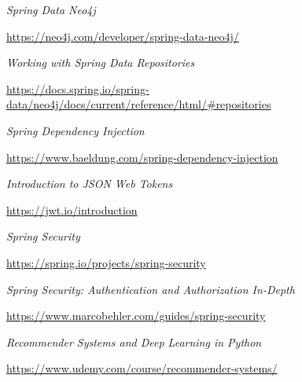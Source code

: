 \documentclass[12pt,a4paper]{report}
\begin{document}
\begin{thebibliography}{9}
  \textit{Spring Data Neo4j}
  
  \url{https://neo4j.com/developer/spring-data-neo4j/}
  
  
  \textit{Working with Spring Data Repositories}
  
  \url{https://docs.spring.io/spring-data/neo4j/docs/current/reference/html/#repositories}
  
  
  \textit{Spring Dependency Injection}
  
  \url{https://www.baeldung.com/spring-dependency-injection}
  
  
  \textit{Introduction to JSON Web Tokens}
  
  \url{https://jwt.io/introduction}
  
  
  \textit{Spring Security}
  
  \url{https://spring.io/projects/spring-security}
  
  
  \textit{Spring Security: Authentication and Authorization In-Depth}
  
  \url{https://www.marcobehler.com/guides/spring-security}
  
  
  \textit{Recommender Systems and Deep Learning in Python}
  
  \url{https://www.udemy.com/course/recommender-systems/}


\end{thebibliography}
\end{document}

